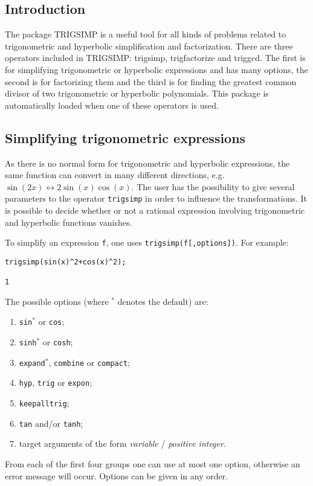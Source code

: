 
\subsection{Introduction}

The \REDUCE{} package TRIGSIMP is a useful tool for all kinds of
problems related to trigonometric and hyperbolic simplification and
factorization.  There are three operators included in TRIGSIMP:
trigsimp, trigfactorize and triggcd.  The first is for simplifying
trigonometric or hyperbolic expressions and has many options, the
second is for factorizing them and the third is for finding the
greatest common divisor of two trigonometric or hyperbolic
polynomials.  This package is automatically loaded when one of these
operators is used.


\subsection{Simplifying trigonometric expressions}

As there is no normal form for trigonometric and hyperbolic
expressions, the same function can convert in many different
directions, e.g.\ $\sin(2x) \leftrightarrow 2\sin(x)\cos(x)$.  The
user has the possibility to give several parameters to the operator
\texttt{trigsimp} in order to influence the transformations.  It is
possible to decide whether or not a rational expression involving
trigonometric and hyperbolic functions vanishes.

To simplify an expression \texttt{f}, one uses
\texttt{trigsimp(f[,options])}.  For example:
\begin{verbatim}
trigsimp(sin(x)^2+cos(x)^2);

1
\end{verbatim}
The possible options (where $^*$ denotes the default) are:
\begin{enumerate}
\item \texttt{sin}$^*$ or \texttt{cos};
\item \texttt{sinh}$^*$ or \texttt{cosh};
\item \texttt{expand}$^*$, \texttt{combine} or \texttt{compact};
\item \texttt{hyp}, \texttt{trig} or \texttt{expon};
\item \texttt{keepalltrig};
\item \texttt{tan} and/or \texttt{tanh};
\item target arguments of the form \textit{variable} /
\textit{positive integer}.
\end{enumerate}
From each of the first four groups one can use at most one option,
otherwise an error message will occur.  Options can be given in any
order.


